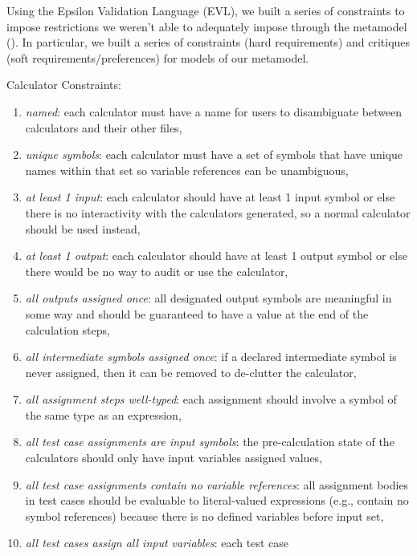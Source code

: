 \documentclass[11pt,fleqn]{article}
\begin{document}
Using the Epsilon Validation Language (EVL), we built a series of constraints to
impose restrictions we weren't able to adequately impose through the metamodel
(). In particular, we built a series of
constraints (hard requirements) and critiques (soft requirements/preferences)
for models of our metamodel.

\noindent{}Calculator Constraints:
\begin{enumerate}
  \item \textit{named}: each calculator must have a name for users to
        disambiguate between calculators and their other files,
  \item \textit{unique symbols}: each calculator must have a set of symbols that
        have unique names within that set so variable references can be
        unambiguous,
  \item \textit{at least 1 input}: each calculator should have at least 1 input
        symbol or else there is no interactivity with the calculators generated,
        so a normal calculator should be used instead,
  \item \textit{at least 1 output}: each calculator should have at least 1
        output symbol or else there would be no way to audit or use the
        calculator,
  \item \textit{all outputs assigned once}: all designated output symbols are
        meaningful in some way and should be guaranteed to have a value at the
        end of the calculation steps,
  \item \textit{all intermediate symbols assigned once}: if a declared
        intermediate symbol is never assigned, then it can be removed to
        de-clutter the calculator,
  \item \textit{all assignment steps well-typed}: each assignment should involve
        a symbol of the same type as an expression,
  \item \textit{all test case assignments are input symbols}: the
        pre-calculation state of the calculators should only have input
        variables assigned values,
  \item \textit{all test case assignments contain no variable references}: all
        assignment bodies in test cases should be evaluable to literal-valued
        expressions (e.g., contain no symbol references) because there is no
        defined variables before input set,
  \item \textit{all test cases assign all input variables}: each test case

\end{enumerate}
\end{document}
